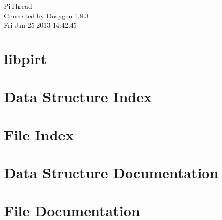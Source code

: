\documentclass{book}
\begin{document}
\hypersetup{pageanchor=false,citecolor=blue}
\begin{titlepage}
\vspace*{7cm}
\begin{center}
{\Large Pi\-Thread }\\
\vspace*{1cm}
{\large Generated by Doxygen 1.8.3}\\
\vspace*{0.5cm}
{\small Fri Jan 25 2013 14:42:45}\\
\end{center}
\end{titlepage}
\clearemptydoublepage
{}
\tableofcontents
\clearemptydoublepage
{}
\hypersetup{pageanchor=true,citecolor=blue}
\chapter{libpirt}
\label{md_README}
\hypertarget{md_README}{}

\chapter{Data Structure Index}

\chapter{File Index}

\chapter{Data Structure Documentation}






















\chapter{File Documentation}






























\printindex
\end{document}

